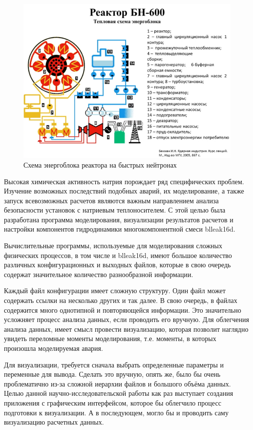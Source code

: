 \begin{figure}[H]
	\centering
	\includegraphics[width=1\linewidth]{pics/bn}
	\caption{Схема энергоблока реактора на быстрых нейтронах}
	\label{fig:bn}
\end{figure}

Высокая химическая активность натрия порождает ряд специфических проблем. Изучение возможных последствий подобных аварий, их моделирование, а также запуск всевозможных расчетов являются важным направлением анализа безопасности установок с натриевым теплоносителем. С этой целью была разработана программа моделирования, визуализации результатов расчетов и настройки компонентов гидродинамики многокомпонентной смеси blleak16d.

Вычислительные программы, используемые для моделирования сложных физических процессов, в том числе и blleak16d, имеют большое количество различных конфигурационных и выходных файлов, которые в свою очередь содержат значительное количество разнообразной информации. 

Каждый файл конфигурации имеет сложную структуру. Один файл может содержать ссылки на несколько других и так далее. В свою очередь, в файлах содержится много однотипной и повторяющейся информации. Это значительно усложняет процесс анализа данных, если проводить его вручную.
Для облегчения анализа данных, имеет смысл провести визуализацию, которая позволит наглядно увидеть переломные моменты моделирования, т.е. моменты, в которых произошла моделируемая авария. 

Для визуализации, требуется сначала выбрать определенные параметры и переменные для вывода. Сделать это вручную, опять же, было бы очень проблематично из-за сложной иерархии файлов и большого объёма данных. Целью данной научно-исследовательской работы как раз выступает создания приложения с графическим интерфейсом, которое бы облегчило процесс подготовки к визуализации. А в последующем, могло бы и проводить саму визуализацию расчетных данных. 



